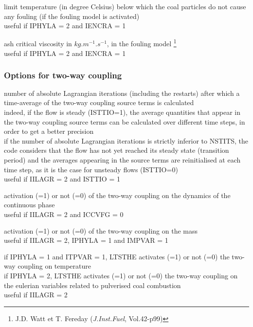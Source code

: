 {limit temperature (in degree Celsius) below which the coal particles do
not cause any fouling (if the fouling model is activated)\\
useful if IPHYLA = 2 and IENCRA = 1}

{ash critical viscosity in $kg.m^{-1}.s^{-1}$, in the fouling model
\footnote{J.D. Watt 
et T. Fereday (\textit{J.Inst.Fuel}, Vol.42-p99)}\\ 
useful if IPHYLA = 2 and IENCRA = 1}

\subsubsection{Options for two-way coupling}

{number of absolute Lagrangian iterations (including the restarts)
after which a time-average of the two-way coupling source terms is
calculated\\
indeed, if the flow is steady (ISTTIO=1), the average quantities that appear in
the two-way coupling source terms can be calculated over different time steps,
in order to get a better precision\\
if the number of absolute Lagrangian iterations is strictly inferior to
NSTITS, the code considers that the flow has not yet reached its steady state
(transition period) and the averages appearing in the source terms are
reinitialised at each time step, as it is the case for unsteady flows (ISTTIO=0)\\
useful if IILAGR = 2 and ISTTIO = 1}

{activation (=1) or not (=0) of the two-way coupling on the dynamics of the
continuous phase\\
useful if IILAGR = 2 and ICCVFG = 0}

{activation (=1) or not (=0) of the two-way coupling on the mass\\
useful if IILAGR = 2, IPHYLA = 1 and IMPVAR = 1}

{if IPHYLA = 1 and ITPVAR = 1, LTSTHE activates (=1) or not (=0) the
two-way coupling on temperature\\
if IPHYLA = 2, LTSTHE activates (=1) or not (=0) the two-way coupling
on the eulerian variables related to pulverised coal combustion\\
useful if IILAGR = 2}

